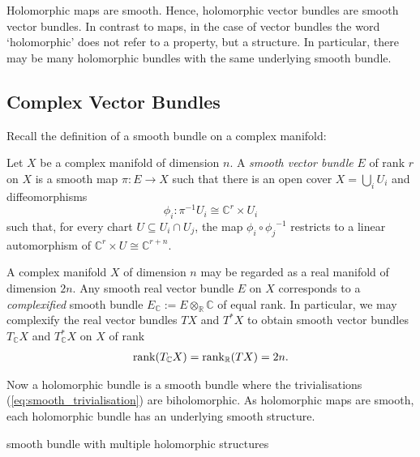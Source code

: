 \documentclass[12pt]{ociamthesis}  %
\begin{document}
Holomorphic maps are smooth. Hence, holomorphic vector bundles
are smooth vector bundles. In contrast to maps, in the case of vector
bundles the word `holomorphic' does not refer to a property, but
a structure. In particular, there may be many holomorphic bundles with
the same underlying smooth bundle.

\subsection{Complex Vector Bundles}

Recall the definition of a smooth bundle on a complex
manifold:

\begin{definition}\label{def:complex_bundle}
  Let $X$ be a complex manifold of dimension $n$. A
  \emph{smooth vector bundle} $E$ of rank $r$ on $X$ is a smooth map
  $\pi : E\to X$ such that there
  is an open cover $X = \bigcup_i U_i$ and diffeomorphisms
  \begin{equation}\label{eq:smooth_trivialisation}
    \phi_i : {\pi}^{-1}U_i \cong \mathbb{C}^r \times U_i
  \end{equation}
  such that, for every chart $U\subseteq U_i\cap U_j$, the
  map $\phi_i \circ {\phi_j}^{-1}$ restricts to a linear
  automorphism of $\mathbb{C}^r\times U \cong \mathbb{C}^{r+n}$.
\end{definition}

\begin{example}
  A complex manifold $X$ of dimension $n$ may be regarded as a
  real manifold of dimension $2n$. Any smooth real vector bundle
  $E$ on $X$ corresponds to a \emph{complexified} smooth bundle
  $E_{\mathbb{C}} := E\otimes_{\mathbb{R}} \mathbb{C}$ of equal rank.
  In particular, we may complexify the real vector bundles
  $TX$ and $T^*X$ to obtain smooth vector bundles
  $T_{\mathbb{C}} X$ and $T_{\mathbb{C}}^*X$
  on $X$ of rank
  \begin{align*}
    \operatorname{rank}(T_\mathbb{C} X)
    = \operatorname{rank}_{\mathbb{R}} (TX) = 2n.
  \end{align*}
\end{example}

Now a holomorphic bundle is a smooth bundle where the trivialisations
(\ref{eq:smooth_trivialisation}) are biholomorphic. As holomorphic
maps are smooth, each holomorphic bundle has an underlying smooth
structure.

\begin{example}
  smooth bundle with multiple holomorphic structures
  \missingexample
\end{example}
\end{document}
